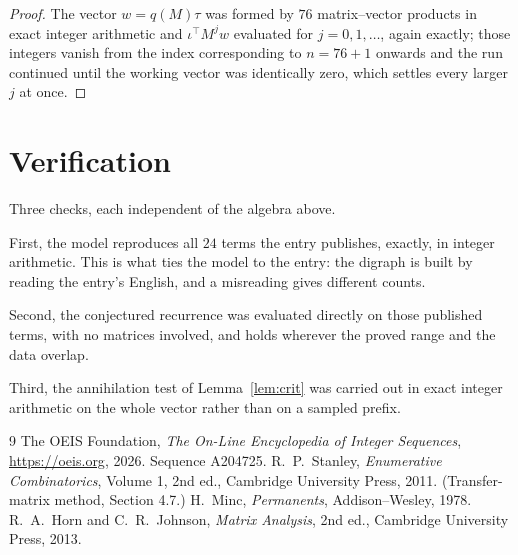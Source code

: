 \documentclass[11pt,a4paper]{article}
\theoremstyle{plain}
\theoremstyle{definition}
\begin{document}
\begin{proof}
The vector $w=q(M)\tau$ was formed by $76$ matrix--vector products in exact integer
arithmetic and $\iota^{\!\top}M^{j}w$ evaluated for $j=0,1,\dots$, again exactly; those
integers vanish from the index corresponding to $n=76+1$ onwards and the run continued
until the working vector was identically zero, which settles every larger $j$ at once.
\end{proof}

\section{Verification}

Three checks, each independent of the algebra above.

First, the model reproduces all $24$ terms the entry publishes, exactly, in integer
arithmetic. This is what ties the model to the entry: the digraph is built by reading the
entry's English, and a misreading gives different counts.

Second, the conjectured recurrence was evaluated directly on those published terms, with no
matrices involved, and holds wherever the proved range and the data overlap.

Third, the annihilation test of Lemma~\ref{lem:crit} was carried out in exact integer
arithmetic on the whole vector rather than on a sampled prefix.

\begin{thebibliography}{9}
 The OEIS Foundation, \emph{The On-Line Encyclopedia of Integer
Sequences}, \url{https://oeis.org}, 2026. Sequence A204725.
 R.~P.~Stanley, \emph{Enumerative Combinatorics}, Volume 1, 2nd ed.,
Cambridge University Press, 2011. (Transfer-matrix method, Section 4.7.)
 H.~Minc, \emph{Permanents}, Addison--Wesley, 1978.
 R.~A.~Horn and C.~R.~Johnson, \emph{Matrix Analysis}, 2nd ed., Cambridge
University Press, 2013.
\end{thebibliography}
\end{document}
